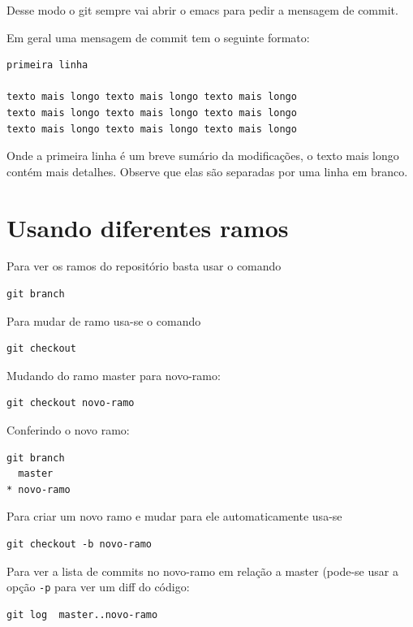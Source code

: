 \documentclass[12pt,brazil]{book}
\begin{document}
Desse modo o git sempre vai abrir o emacs para pedir a mensagem de
commit.

Em geral uma mensagem de commit tem o seguinte formato:

\begin{verbatim}
primeira linha

texto mais longo texto mais longo texto mais longo
texto mais longo texto mais longo texto mais longo
texto mais longo texto mais longo texto mais longo 
\end{verbatim}

Onde a primeira linha é um breve sumário da modificações, o texto mais
longo contém mais detalhes. Observe que elas são separadas por uma
linha em branco.

\section{Usando diferentes ramos}
\label{sec:usando-o-git}

Para ver os ramos do repositório basta usar o comando

\begin{verbatim}
git branch
\end{verbatim}

Para mudar de ramo usa-se o comando

\begin{verbatim}
git checkout
\end{verbatim}

Mudando do ramo master para novo-ramo:

\begin{verbatim}
git checkout novo-ramo
\end{verbatim}

Conferindo o novo ramo:

\begin{verbatim}
git branch
  master
* novo-ramo
\end{verbatim}

Para criar um novo ramo e mudar para ele automaticamente usa-se

\begin{verbatim}
git checkout -b novo-ramo
\end{verbatim}

Para ver a lista de commits no novo-ramo em relação a master (pode-se
usar a opção \texttt{-p} para ver um diff do código:

\begin{verbatim}
git log  master..novo-ramo
\end{verbatim}
\end{document}
